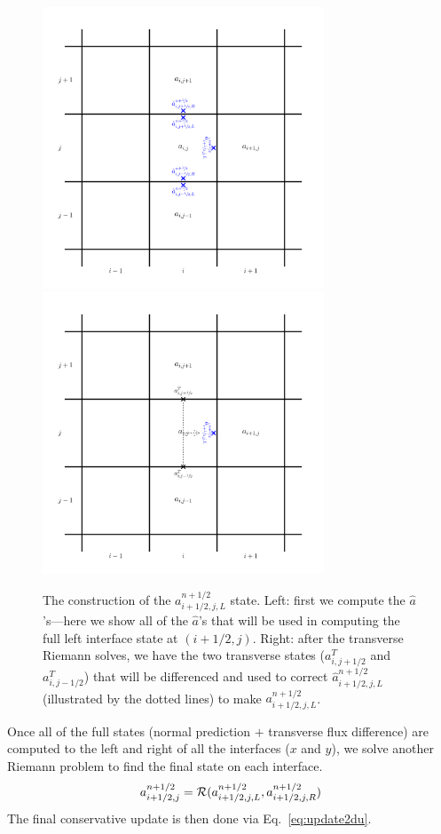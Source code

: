 \documentclass[11pt]{article}
\begin{document}
\begin{figure}
\centering
\includegraphics[width=3.3in]{2dgrid-hat}
\includegraphics[width=3.3in]{2dgrid-transverse}
\caption{\label{fig:unsplitstates} The construction of the
  $a_{i+1/2,j,L}^{n+1/2}$ state.  Left: first we compute the
  $\hat{a}$'s---here we show all of the $\hat{a}$'s that will be used
  in computing the full left interface state at $(i+1/2,j)$.  Right:
  after the transverse Riemann solves, we have the two transverse
  states ($a^T_{i,j+1/2}$ and $a^T_{i,j-1/2}$) that will be
  differenced and used to correct $\hat{a}_{i+1/2,j,L}^{n+1/2}$
  (illustrated by the dotted lines) to make $a_{i+1/2,j,L}^{n+1/2}$.}
\end{figure}

Once all of the full states (normal prediction $+$ transverse flux
difference) are computed to the left and right of all the interfaces
($x$ and $y$), we solve another Riemann problem to find the final 
state on each interface.
\begin{equation}
a_{i+1/2,j}^{n+1/2} = \mathcal{R}(a_{i+1/2,j,L}^{n+1/2},
                                  a_{i+1/2,j,R}^{n+1/2}) \\
\end{equation}
The final conservative update is then done via Eq.~\ref{eq:update2du}.
\end{document}
